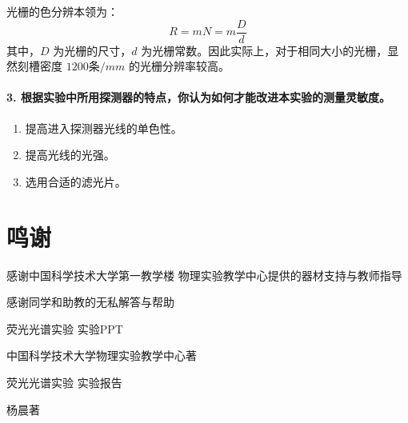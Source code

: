 \documentclass[hyperref]{ctexart}
\begin{document}
\begin{multicols}{2}
		光栅的色分辨本领为：
		$$
		R=mN=m\frac{D}{d}
		$$
		其中，$D$ 为光栅的尺寸，$d$ 为光栅常数。因此实际上，对于相同大小的光栅，显然刻槽密度 $1200条/mm$ 的光栅分辨率较高。
		
		\paragraph{3. 根据实验中所用探测器的特点，你认为如何才能改进本实验的测量灵敏度。}
		
		\begin{enumerate}
			\item	提高进入探测器光线的单色性。
			\item	提高光线的光强。
			\item	选用合适的滤光片。
		\end{enumerate}
		
		
		
		\section*{鸣谢}
		感谢中国科学技术大学第一教学楼 物理实验教学中心提供的器材支持与教师指导
		
		
		感谢同学和助教的无私解答与帮助
		
		
		\begin{thebibliography}{100}%
			荧光光谱实验 实验PPT
			
			
			中国科学技术大学物理实验教学中心\quad 著
			
			荧光光谱实验 实验报告
			
			杨晨\quad 著
			
		\end{thebibliography}
		
	\end{multicols}
\end{document}
